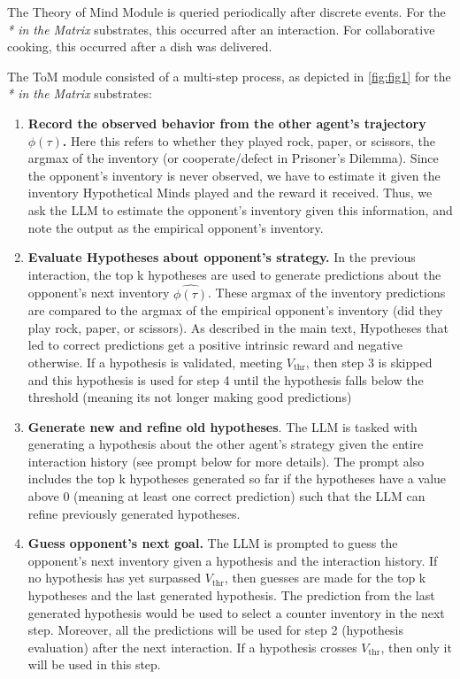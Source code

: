 \documentclass{article} %
\begin{document}
The Theory of Mind Module is queried periodically after discrete events. For the \textit{* in the Matrix} substrates, this occurred after an interaction. For collaborative cooking, this occurred after a dish was delivered. 

The ToM module consisted of a multi-step process, as depicted in \autoref{fig:fig1} for the \textit{* in the Matrix} substrates:
\begin{enumerate}
    \item \textbf{Record the observed behavior from the other agent's trajectory \( \phi(\tau) \).} Here this refers to whether they played rock, paper, or scissors, the argmax of the inventory (or cooperate/defect in Prisoner's Dilemma). Since the opponent's inventory is never observed, we have to estimate it given the inventory Hypothetical Minds played and the reward it received. Thus, we ask the LLM to estimate the opponent's inventory given this information, and note the output as the empirical opponent's inventory.
    \item \textbf{Evaluate Hypotheses about opponent's strategy.} In the previous interaction, the top k hypotheses are used to generate predictions about the opponent's next inventory \( \hat{\phi(\tau)} \). These argmax of the inventory predictions are compared to the argmax of the empirical opponent's inventory (did they play rock, paper, or scissors). As described in the main text, Hypotheses that led to correct predictions get a positive intrinsic reward and negative otherwise. If a hypothesis is validated, meeting $V_{\text{thr}}$, then step 3 is skipped and this hypothesis is used for step 4 until the hypothesis falls below the threshold (meaning its not longer making good predictions)
    \item \textbf{Generate new and refine old hypotheses}. The LLM is tasked with generating a hypothesis about the other agent's strategy given the entire interaction history (see prompt below for more details). The prompt also includes the top k hypotheses generated so far if the hypotheses have a value above 0 (meaning at least one correct prediction) such that the LLM can refine previously generated hypotheses. 
    \item \textbf{Guess opponent's next goal.} The LLM is prompted to guess the opponent's next inventory given a hypothesis and the interaction history. If no hypothesis has yet surpassed $V_{\text{thr}}$, then guesses are made for the top k hypotheses and the last generated hypothesis. The prediction from the last generated hypothesis would be used to select a counter inventory in the next step. Moreover, all the predictions will be used for step 2 (hypothesis evaluation) after the next interaction. If a hypothesis crosses $V_{\text{thr}}$, then only it will be used in this step.

\end{enumerate}
\end{document}
